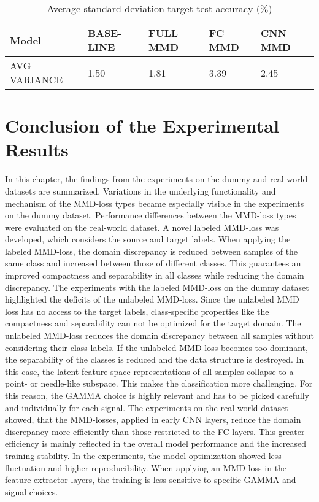 \begin {table}[H]
\centering
\begin{tabular}{lllll}
  \toprule
  Model & BASE-LINE & FULL MMD & FC MMD & CNN MMD\\
  \midrule
  AVG VARIANCE & 1.50 & 1.81 & 3.39 & 2.45\\
  \bottomrule
\end{tabular}
\caption {Average standard deviation target test accuracy (\%)} \label{tab:Average_Variance_Accuracy} 
\end {table}

\section{Conclusion of the Experimental Results}\label{sec:Performance_overview}
In this chapter, the findings from the experiments on the dummy and real-world datasets are summarized. Variations in the underlying functionality and mechanism of the MMD-loss types became especially visible in the experiments on the dummy dataset. Performance differences between the MMD-loss types were evaluated on the real-world dataset. A novel labeled MMD-loss was developed, which considers the source and target labels. When applying the labeled MMD-loss, the domain discrepancy is reduced between samples of the same class and increased between those of different classes. This guarantees an improved compactness and separability in all classes while reducing the domain discrepancy. The experiments with the labeled MMD-loss on the dummy dataset highlighted the deficits of the unlabeled MMD-loss. Since the unlabeled MMD loss has no access to the target labels, class-specific properties like the compactness and separability can not be optimized for the target domain. The unlabeled MMD-loss reduces the domain discrepancy between all samples without considering their class labels. If the unlabeled MMD-loss becomes too dominant, the separability of the classes is reduced and the data structure is destroyed. In this case, the latent feature space representations of all samples collapse to a point- or needle-like subspace. This makes the classification more challenging. For this reason, the GAMMA choice is highly relevant and has to be picked carefully and individually for each signal. The experiments on the real-world dataset showed, that the MMD-losses, applied in early CNN layers, reduce the domain discrepancy more efficiently than those restricted to the FC layers. This greater efficiency is mainly reflected in the overall model performance and the increased training stability. In the experiments, the model optimization showed less fluctuation and higher reproducibility. When applying an MMD-loss in the feature extractor layers, the training is less sensitive to specific GAMMA and signal choices. 